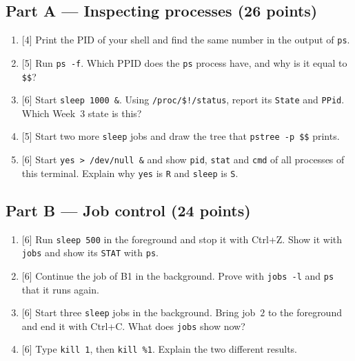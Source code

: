 \documentclass[11pt,a4paper]{article}
\newcommand{\cmd}[1]{\texttt{#1}}
\begin{document}
\subsection*{Part A --- Inspecting processes (26 points)}
\begin{enumerate}[leftmargin=2.2em,label=\textbf{A\arabic*}]
  \item {[4]} Print the PID of your shell and find the same number in the output of \cmd{ps}.
  \item {[5]} Run \cmd{ps -f}. Which PPID does the \cmd{ps} process have, and why is it equal to \verb|$$|?
  \item {[6]} Start \cmd{sleep 1000 \&}. Using \texttt{/proc/\$!/status}, report its \texttt{State} and \texttt{PPid}. Which Week~3 state is this?
  \item {[5]} Start two more \cmd{sleep} jobs and draw the tree that \cmd{pstree -p \$\$} prints.
  \item {[6]} Start \cmd{yes > /dev/null \&} and show \texttt{pid}, \texttt{stat} and \texttt{cmd} of all processes of this terminal. Explain why \cmd{yes} is \texttt{R} and \cmd{sleep} is \texttt{S}.
\end{enumerate}

\subsection*{Part B --- Job control (24 points)}
\begin{enumerate}[leftmargin=2.2em,label=\textbf{B\arabic*}]
  \item {[6]} Run \cmd{sleep 500} in the foreground and stop it with Ctrl+Z. Show it with \cmd{jobs} and show its \texttt{STAT} with \cmd{ps}.
  \item {[6]} Continue the job of B1 in the background. Prove with \cmd{jobs -l} and \cmd{ps} that it runs again.
  \item {[6]} Start three \cmd{sleep} jobs in the background. Bring job~$2$ to the foreground and end it with Ctrl+C. What does \cmd{jobs} show now?
  \item {[6]} Type \cmd{kill 1}, then \cmd{kill \%1}. Explain the two different results.
\end{enumerate}
\end{document}
